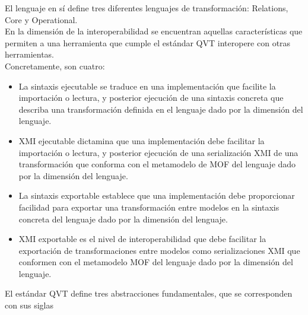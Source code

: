 El lenguaje en sí define tres diferentes lenguajes de transformación: Relations, Core y Operational.\\

En la dimensión de la interoperabilidad se encuentran aquellas características que permiten a una herramienta que cumple el estándar QVT interopere con otras herramientas.\\
Concretamente, son cuatro:

\begin{itemize}
	\item La sintaxis ejecutable se traduce en una implementación que facilite la importación o lectura, y posterior ejecución de una sintaxis concreta que describa una transformación definida en el lenguaje dado por la dimensión del lenguaje.	 	 	 	
	\item XMI ejecutable dictamina que una implementación debe facilitar la importación o lectura, y posterior ejecución de una serialización XMI de una transformación que conforma con el metamodelo de MOF del lenguaje dado por la dimensión del lenguaje. 	
	\item La sintaxis exportable establece que una implementación debe proporcionar facilidad para exportar una transformación entre modelos en la sintaxis concreta del lenguaje dado por la dimensión del lenguaje. 	 	 	
	\item XMI exportable es el nivel de interoperabilidad que debe facilitar la exportación de transformaciones entre modelos como serializaciones XMI que conformen con el metamodelo MOF del lenguaje dado por la dimensión del lenguaje.
\end{itemize}

El estándar QVT define tres abstracciones fundamentales, que se corresponden con sus siglas

